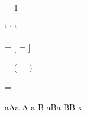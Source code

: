 \documentclass{article}
\makeatletter
\def\newXeTeXintercharclass{%
 \e@alloc\XeTeXcharclass
   \chardef\xe@alloc@intercharclass\m@ne\e@alloc@intercharclass@top}
\makeatother
\begin{document}
\XeTeXinterchartokenstate = 1

\newXeTeXintercharclass \mycharclassa
\newXeTeXintercharclass \mycharclassA
\newXeTeXintercharclass \mycharclassB

\XeTeXcharclass `\a \mycharclassa
\XeTeXcharclass `\A \mycharclassA
\XeTeXcharclass `\B \mycharclassB

\XeTeXinterchartoks \mycharclassa \mycharclassA = {[\itshape}
\XeTeXinterchartoks \mycharclassA \mycharclassa = {\upshape]}

 \mycharclassB = {\color{blue}(}
\XeTeXinterchartoks {} = {)\color{black}}


\XeTeXinterchartoks \mycharclassB \mycharclassB = {.}

aAa A a B aBa BB x
\end{document}
